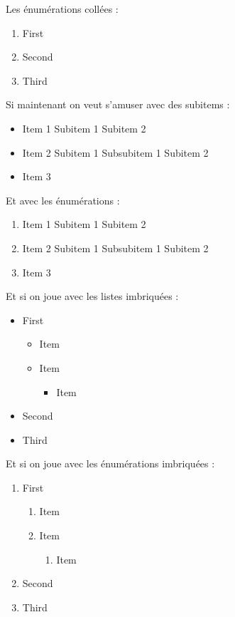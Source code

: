 \documentclass[a4paper,11pt]{report}    %
\begin{document}
Les énumérations collées :
\begin{enumerate}
	\item First
	\item Second
	\item Third
\end{enumerate}

\newpage

Si maintenant on veut s'amuser avec des subitems :
\begin{itemize}
	\item Item 1
	\subitem Subitem 1
	\subitem Subitem 2
	\item Item 2
	\subitem Subitem 1
	\subsubitem Subsubitem 1
	\subitem Subitem 2
	\item Item 3
\end{itemize}

Et avec les énumérations :
\begin{enumerate}
	\item Item 1
	\subitem Subitem 1
	\subitem Subitem 2
	\item Item 2
	\subitem Subitem 1
	\subsubitem Subsubitem 1
	\subitem Subitem 2
	\item Item 3
\end{enumerate}

Et si on joue avec les listes imbriquées :
\begin{itemize}
	\item First
	\begin{itemize}
		\item Item
		\item Item
		\begin{itemize}
			\item Item
		\end{itemize}
	\end{itemize}
	\item Second
	\item Third
\end{itemize}

Et si on joue avec les énumérations imbriquées :
\begin{enumerate}
	\item First
	\begin{enumerate}
		\item Item
		\item Item
		\begin{enumerate}
			\item Item
		\end{enumerate}
	\end{enumerate}
	\item Second
	\item Third
\end{enumerate}
\end{document}
